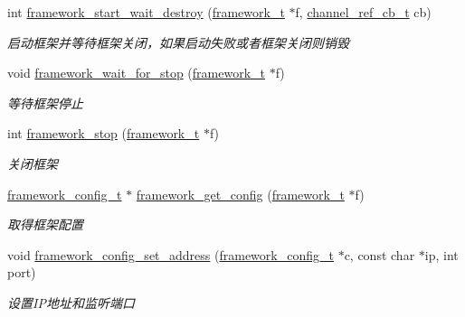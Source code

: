 \begin{DoxyCompactItemize}
int \hyperlink{a00093_ga0593beee9da9b0858ad53c4f81671622_ga0593beee9da9b0858ad53c4f81671622}{framework\+\_\+start\+\_\+wait\+\_\+destroy} (\hyperlink{a00047_a6149d769f6f07ed14a40a271c95d8463_a6149d769f6f07ed14a40a271c95d8463}{framework\+\_\+t} $\ast$f, \hyperlink{a00047_ae296ec4d1ce108960de8dcc423956a1d_ae296ec4d1ce108960de8dcc423956a1d}{channel\+\_\+ref\+\_\+cb\+\_\+t} cb)
\begin{DoxyCompactList}\small\item\em 启动框架并等待框架关闭，如果启动失败或者框架关闭则销毁 \end{DoxyCompactList}\item 
void \hyperlink{a00093_gaefec7da1b548ddb97c73c8924ba17069_gaefec7da1b548ddb97c73c8924ba17069}{framework\+\_\+wait\+\_\+for\+\_\+stop} (\hyperlink{a00047_a6149d769f6f07ed14a40a271c95d8463_a6149d769f6f07ed14a40a271c95d8463}{framework\+\_\+t} $\ast$f)
\begin{DoxyCompactList}\small\item\em 等待框架停止 \end{DoxyCompactList}\item 
int \hyperlink{a00093_ga429be76d09278d6170f1b519f4dbb689_ga429be76d09278d6170f1b519f4dbb689}{framework\+\_\+stop} (\hyperlink{a00047_a6149d769f6f07ed14a40a271c95d8463_a6149d769f6f07ed14a40a271c95d8463}{framework\+\_\+t} $\ast$f)
\begin{DoxyCompactList}\small\item\em 关闭框架 \end{DoxyCompactList}\item 
\hyperlink{a00047_a55b26efa9e6ee05514d087ba2593a54b_a55b26efa9e6ee05514d087ba2593a54b}{framework\+\_\+config\+\_\+t} $\ast$ \hyperlink{a00093_gaf0524cc257c8e57ba11d676dcca6bf64_gaf0524cc257c8e57ba11d676dcca6bf64}{framework\+\_\+get\+\_\+config} (\hyperlink{a00047_a6149d769f6f07ed14a40a271c95d8463_a6149d769f6f07ed14a40a271c95d8463}{framework\+\_\+t} $\ast$f)
\begin{DoxyCompactList}\small\item\em 取得框架配置 \end{DoxyCompactList}\item 
void \hyperlink{a00093_ga63620720efce87c837a3f069f626f6b1_ga63620720efce87c837a3f069f626f6b1}{framework\+\_\+config\+\_\+set\+\_\+address} (\hyperlink{a00047_a55b26efa9e6ee05514d087ba2593a54b_a55b26efa9e6ee05514d087ba2593a54b}{framework\+\_\+config\+\_\+t} $\ast$c, const char $\ast$ip, int port)
\begin{DoxyCompactList}\small\item\em 设置\+I\+P地址和监听端口 \end{DoxyCompactList}\item 

\end{DoxyCompactItemize}
